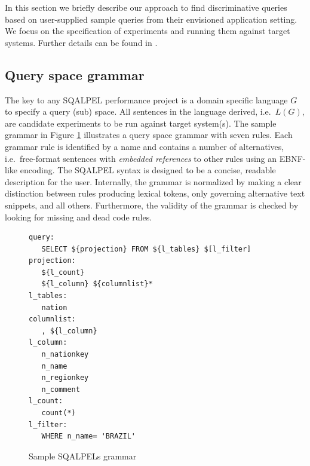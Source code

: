 \documentclass{cidr-2019}
\begin{document}
In this section we briefly describe our approach to find
discriminative queries based on user-supplied sample queries from
their envisioned application setting. We focus on the specification
of experiments and running them against target systems. Further
details can be found in \cite{DBLP:conf/sigmod/KerstenKZ18}.

\subsection{Query space grammar}\label{specification}
The key to any {\sc SQALPEL} performance project is a domain specific
language $G$ to specify a query (sub) space. All sentences in the
language derived, i.e.\ $L(G)$, are candidate experiments to be run
against target system(s). The sample grammar in Figure
\ref{fig:script1} illustrates a query space grammar with seven rules.
Each grammar rule is identified by a name and contains a number of
alternatives, i.e.\ free-format sentences with \textit{embedded
  references} to other rules using an EBNF-like encoding.
The {\sc SQALPEL} syntax is designed to be a concise, readable
description for the user. Internally, the grammar is normalized by
making a clear distinction between rules producing lexical tokens,
only governing alternative text snippets, and all others.
Furthermore, the validity of the grammar is checked by looking for
missing and dead code rules.

\begin{figure}[t]
\begin{verbatim}
query:
   SELECT ${projection} FROM ${l_tables} $[l_filter]
projection:
   ${l_count}
   ${l_column} ${columnlist}*
l_tables:
   nation
columnlist:
   , ${l_column}
l_column: 
   n_nationkey
   n_name
   n_regionkey
   n_comment
l_count: 
   count(*)
l_filter: 
   WHERE n_name= 'BRAZIL'
\end{verbatim}
	\caption{Sample {\sc SQALPELs} grammar \label{fig:script1}}
\end{figure}
\end{document}
